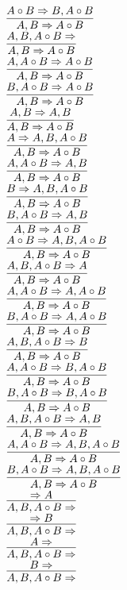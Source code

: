 \documentclass[11pt]{article}
\begin{document}
\begin{center}
\bigskip
\\$\infer{A, B\Rightarrow A\circ B}{A\circ B\Rightarrow B, A\circ B}$
\bigskip
\\$\infer{A, B\Rightarrow A\circ B}{A, B, A\circ B\Rightarrow }$
\bigskip
\\$\infer{A, B\Rightarrow A\circ B}{A, A\circ B\Rightarrow A\circ B}$
\bigskip
\\$\infer{A, B\Rightarrow A\circ B}{B, A\circ B\Rightarrow A\circ B}$
\bigskip
\\$\infer{A, B\Rightarrow A\circ B}{A, B\Rightarrow A, B}$
\bigskip
\\$\infer{A, B\Rightarrow A\circ B}{A\Rightarrow A, B, A\circ B}$
\bigskip
\\$\infer{A, B\Rightarrow A\circ B}{A, A\circ B\Rightarrow A, B}$
\bigskip
\\$\infer{A, B\Rightarrow A\circ B}{B\Rightarrow A, B, A\circ B}$
\bigskip
\\$\infer{A, B\Rightarrow A\circ B}{B, A\circ B\Rightarrow A, B}$
\bigskip
\\$\infer{A, B\Rightarrow A\circ B}{A\circ B\Rightarrow A, B, A\circ B}$
\bigskip
\\$\infer{A, B\Rightarrow A\circ B}{A, B, A\circ B\Rightarrow A}$
\bigskip
\\$\infer{A, B\Rightarrow A\circ B}{A, A\circ B\Rightarrow A, A\circ B}$
\bigskip
\\$\infer{A, B\Rightarrow A\circ B}{B, A\circ B\Rightarrow A, A\circ B}$
\bigskip
\\$\infer{A, B\Rightarrow A\circ B}{A, B, A\circ B\Rightarrow B}$
\bigskip
\\$\infer{A, B\Rightarrow A\circ B}{A, A\circ B\Rightarrow B, A\circ B}$
\bigskip
\\$\infer{A, B\Rightarrow A\circ B}{B, A\circ B\Rightarrow B, A\circ B}$
\bigskip
\\$\infer{A, B\Rightarrow A\circ B}{A, B, A\circ B\Rightarrow A, B}$
\bigskip
\\$\infer{A, B\Rightarrow A\circ B}{A, A\circ B\Rightarrow A, B, A\circ B}$
\bigskip
\\$\infer{A, B\Rightarrow A\circ B}{B, A\circ B\Rightarrow A, B, A\circ B}$
\bigskip
\\$\infer{A, B, A\circ B\Rightarrow }{\Rightarrow A}$
\bigskip
\\$\infer{A, B, A\circ B\Rightarrow }{\Rightarrow B}$
\bigskip
\\$\infer{A, B, A\circ B\Rightarrow }{A\Rightarrow }$
\bigskip
\\$\infer{A, B, A\circ B\Rightarrow }{B\Rightarrow }$

\end{center}
\end{document}
